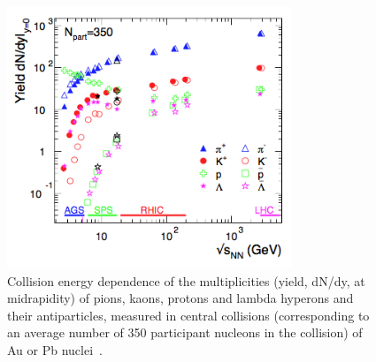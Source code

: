 \begin{figure}[!t]
  \centering
  \includegraphics[width=8.5cm]{FigCap1/YieldsVsEnergyAndronic.png}
  \caption{Collision energy dependence of the multiplicities (yield, dN/dy, at midrapidity) of pions, kaons, protons and lambda hyperons and their antiparticles, measured in central collisions (corresponding to an average number of 350 participant nucleons in the collision) of Au or Pb nuclei~\cite{Andronic:2014zha}.}
  \label{fig:YieldsVsEnergyAndronic}
\end{figure}

